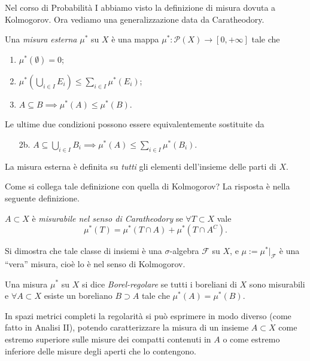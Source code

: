 Nel corso di Probabilità I abbiamo visto la definizione di misura dovuta a Kolmogorov. 
Ora vediamo una generalizzazione data da Caratheodory.

\begin{definizione}
	Una \emph{misura esterna} $\mu^{*}$ su $X$ è una mappa $\mu^{*}:\mathcal P(X)\to [0,+\infty]$ tale che 
	\begin{enumerate}
		\item $\mu^{*}(\emptyset) = 0$;
		\item $\mu^{*}\left(\bigcup_{i\in I}E_{i}\right) \leq \sum_{i\in I}\mu^{*}(E_{i})$;
		\item $A\subseteq B\implies\mu^{*}(A)\leq \mu^{*}(B)$.
	\end{enumerate}
	Le ultime due condizioni possono essere equivalentemente sostituite da 
	\begin{enumerate}
		\item[2b.] $A\subseteq\bigcup_{i\in I}B_{i}\implies \mu^{*}(A)\leq \sum_{i\in I}\mu^{*}(B_{i})$.
	\end{enumerate}
\end{definizione}
\begin{osservazione}
	La misura esterna è definita su \emph{tutti} gli elementi dell'insieme delle parti di $X$.
\end{osservazione}

	Come si collega tale definizione con quella di Kolmogorov? La risposta è nella seguente definizione.
\begin{definizione}
	$A\subset X$ è \emph{misurabile nel senso di Caratheodory} se $\forall T\subset X$ vale 
	$$\mu^{*}(T) = \mu^{*}(T\cap A) + \mu^{*}(T\cap A^{C}).$$
\end{definizione}
	Si dimostra che tale classe di insiemi è una $\sigma$-algebra $\mathcal F$ su $X$, e $\mu := \mu^{*}\big|_{\mathcal F}$ è una ``vera'' misura, cioè lo è nel senso di Kolmogorov.
	
\begin{definizione}
	Una misura $\mu^{*}$ su $X$ si dice \emph{Borel-regolare} se tutti i boreliani di $X$ sono misurabili e $\forall A\subset X$ esiste un boreliano $B\supset A$ tale che $\mu^{*}(A) = \mu^{*}(B)$.
\end{definizione}
	In spazi metrici completi la regolarità si può esprimere in modo diverso (come fatto in Analisi II), potendo caratterizzare la misura di un insieme $A\subset X$ come estremo superiore sulle misure dei compatti contenuti in $A$ o come estremo inferiore delle misure degli aperti che lo contengono. 
	
